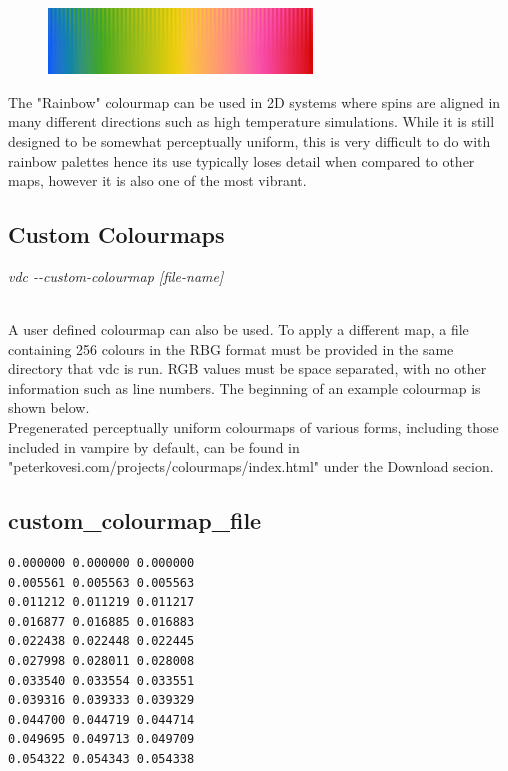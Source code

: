 \begin{figure}[!h]
\center
\includegraphics[width=7cm]{figures/Rainbow_colourmap.jpg}
\label{fig:Rainbow_colourmap}
\end{figure}

The "Rainbow" colourmap can be used in 2D systems where spins are aligned in many different directions such as high temperature simulations. While it is still designed to be somewhat perceptually uniform, this is very difficult to do with rainbow palettes hence its use typically loses detail when compared to other maps, however it is also one of the most vibrant. \\

\subsection*{Custom Colourmaps}

\begin{minipage}[c]{\textwidth}
\centering
\textit{vdc -{}-custom-colourmap [file-name]}
\end{minipage}\\

A user defined colourmap can also be used. To apply a different map, a file containing 256 colours in the RBG format must be provided in the same directory that vdc is run. RGB values must be space separated, with no other information such as line numbers. The beginning of an example colourmap is shown below. \\

Pregenerated perceptually uniform colourmaps of various forms, including those included in vampire by default, can be found in "peterkovesi.com/projects/colourmaps/index.html" under the Download secion. \\

\subsection*{custom\_colourmap\_file}
{\footnotesize
\begin{verbatim}
0.000000 0.000000 0.000000
0.005561 0.005563 0.005563
0.011212 0.011219 0.011217
0.016877 0.016885 0.016883
0.022438 0.022448 0.022445
0.027998 0.028011 0.028008
0.033540 0.033554 0.033551
0.039316 0.039333 0.039329
0.044700 0.044719 0.044714
0.049695 0.049713 0.049709
0.054322 0.054343 0.054338
\end{verbatim}
}

